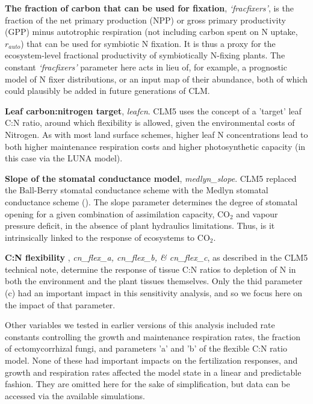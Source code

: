 \usepackage{}\documentclass[draft,linenumbers]{agujournal}
\begin{document}
\textbf{The fraction of carbon that can be used for fixation}, \emph{`fracfixers'}, is the fraction of the net primary production (NPP) or gross primary productivity (GPP) minus autotrophic respiration (not including carbon spent on N uptake, $r_{auto}$) that can be used for symbiotic N fixation.  It is thus a proxy for the ecosystem-level fractional productivity of symbiotically N-fixing plants. The constant \emph{`fracfixers'} parameter here acts in lieu of, for example, a prognostic model of N fixer distributions, or an input map of their abundance, both of which could plausibly be added in future generations of CLM. 

\textbf{Leaf carbon:nitrogen target}, \emph{leafcn}. CLM5 uses the concept of a 'target' leaf C:N ratio, around which flexibility is allowed, given the environmental costs of Nitrogen. As with most land surface schemes, higher leaf N concentrations lead to both higher maintenance respiration costs and higher photosynthetic capacity (in this case via the LUNA model).  

\textbf{Slope of the stomatal conductance model}, \emph{medlyn\_slope}. CLM5 replaced the Ball-Berry stomatal conductance scheme with the Medlyn stomatal conductance scheme (\cite{medlyn2011}). The slope parameter determines the degree of stomatal opening for a given combination of assimilation capacity, CO$_{2}$ and vapour pressure deficit, in the absence of plant hydraulics limitations. Thus, is it intrinsically linked to the response of ecosystems to CO$_{2}$. 

\textbf{C:N flexibility }, \emph{cn\_flex\_a, cn\_flex\_b, \& cn\_flex\_c},  as described in the CLM5 technical note, determine the response of tissue C:N ratios to depletion of N in both the environment and the plant tissues themselves. Only the thid parameter (c) had an important impact in this sensitivity analysis, and so we focus here on the impact of that parameter. 

Other variables we tested in earlier versions of this analysis included rate constants controlling the growth and maintenance respiration rates, the fraction of ectomycorrhizal fungi, and parameters 'a' and 'b' of the flexible C:N ratio model. None of these had important impacts on the fertilization responses, and growth and respiration rates affected the model state in a linear and predictable fashion. They are omitted here for the sake of simplification, but data can be accessed via the available simulations. 
\end{document}
